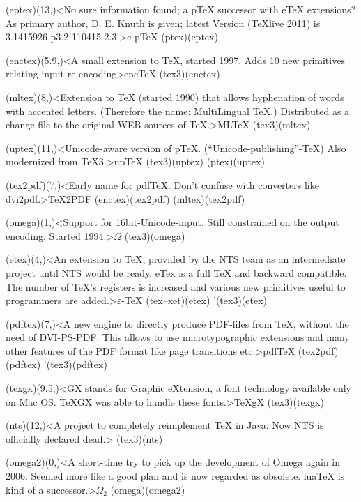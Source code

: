 {	\tonode(eptex)(13,\layer)<No sure information found; a pTeX successor with eTeX extensions? As primary author, D. E. Knuth is given; latest Version (TeXlive 2011) is 3.1415926-p3.2-110415-2.3.>{e-p\TeX}
	\todraw(ptex)(eptex)
	
	\steplayer[-2]
	\tonode(enctex)(5.9,\layer)<A small extension to TeX, started 1997. Adds 10 new primitives relating input re-encoding>{enc\TeX}
	\todraw(tex3)(enctex)
	
	\tonode(mltex)(8,\layer)<Extension to TeX (started 1990) that allows hyphenation of words with accented letters. (Therefore the name: MultiLingual TeX.) Distributed as a change file to the original WEB sources of TeX.>{ML\TeX}
	\todraw(tex3)(mltex)
	
	\tonode[\experimental](uptex)(11,\layer)<Unicode-aware version of pTeX. (“Unicode-publishing”-TeX) Also modernized from TeX3.>{up\TeX}
	\todraw(tex3)(uptex)
	\todraw(ptex)(uptex)

	\steplayer[-2]
	\tonode(tex2pdf)(7,\layer)<Early name for pdfTeX. Don't confuse with converters like dvi2pdf.>{\TeX2PDF}
	\todraw(enctex)(tex2pdf)
	\todraw(mltex)(tex2pdf)
	
	\steplayer[-2]
	\tonode(omega)(1,\layer)<Support for 16bit-Unicode-input. Still constrained on the output encoding. Started 1994.>{$\Omega$}
	\todraw(tex3)(omega)
	
	\tonode[\vip](etex)(4,\layer)<An extension to TeX, provided by the NTS team as an intermediate project until NTS would be ready. eTex is a full TeX and backward compatible. The number of TeX's registers is increased and various new primitives useful to programmers are added.>{$\varepsilon$-\TeX}
	\todraw(tex--xet)(etex)
	\todraw'(tex3)(etex)
	
	\tonode[\vip](pdftex)(7,\layer)<A new engine to directly produce PDF-files from TeX, without the need of DVI-PS-PDF. This allows to use microtypographic extensions and many other features of the PDF format like page transitions etc.>{pdf\TeX}
	\todraw(tex2pdf)(pdftex)
	\todraw'(tex3)(pdftex)
	
	\tonode(texgx)(9.5,\layer)<GX stands for Graphic eXtension, a font technology available only on Mac OS. TeXGX was able to handle these fonts.>{\TeX{}gX}
	\todraw(tex3)(texgx)
	
	\tonode(nts)(12,\layer)<A project to completely reimplement TeX in Java. Now NTS is officially declared dead.>{\NTS}
	\todraw(tex3)(nts)
	
	\steplayer[-2]
	\tonode[\experimental](omega2)(0,\layer)<A short-time try to pick up the development of Omega again in 2006. Seemed more like a good plan and is now regarded as obsolete. luaTeX is kind of a successor.>{$\Omega_2$}
	\todraw(omega)(omega2)
	
}
